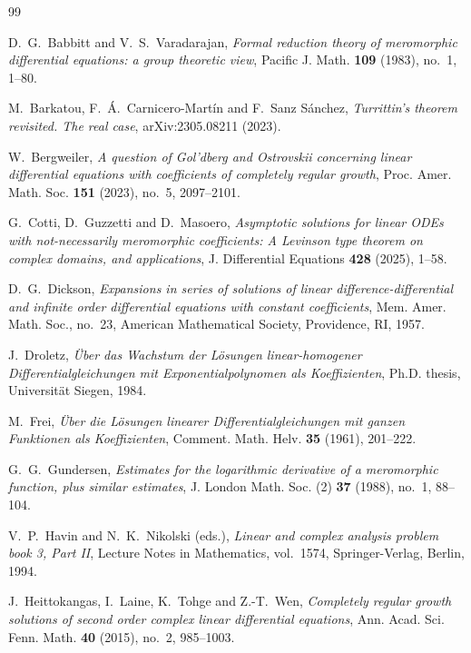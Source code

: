 \documentclass[a4paper,12pt]{article}
\numberwithin{equation}{section}
\begin{document}
\begin{thebibliography}{99}

D.~G.~Babbitt and V.~S.~Varadarajan,
\emph{Formal reduction theory of meromorphic differential equations:
a group theoretic view},
Pacific J. Math. \textbf{109} (1983), no.~1, 1--80.

M.~Barkatou, F.~\'A.~Carnicero-Mart\'in and F.~Sanz S\'anchez,
\emph{Turrittin's theorem revisited. The real case},
arXiv:2305.08211 (2023).

W.~Bergweiler,
\emph{A question of Gol'dberg and Ostrovskii concerning linear differential equations with coefficients of completely regular growth},
Proc. Amer. Math. Soc. \textbf{151} (2023), no.~5, 2097--2101.

G.~Cotti, D.~Guzzetti and D.~Masoero,
\emph{Asymptotic solutions for linear ODEs with not-necessarily
meromorphic coefficients: A Levinson type theorem on complex domains,
and applications},
J. Differential Equations \textbf{428} (2025), 1--58.

D.~G.~Dickson,
\emph{Expansions in series of solutions of linear difference-differential and infinite order differential equations with constant coefficients},
Mem. Amer. Math. Soc., no.~23,
American Mathematical Society, Providence, RI, 1957.

J.~Droletz,
\emph{\"Uber das Wachstum der L\"osungen linear-homogener Differentialgleichungen mit Exponentialpolynomen als Koeffizienten},
Ph.D. thesis, Universit\"at Siegen, 1984.

M.~Frei,
\emph{\"Uber die L\"osungen linearer Differentialgleichungen mit ganzen Funktionen als Koeffizienten},
Comment. Math. Helv. \textbf{35} (1961), 201--222.

G.~G.~Gundersen,
\emph{Estimates for the logarithmic derivative of a meromorphic function, plus similar estimates},
J. London Math. Soc. (2) \textbf{37} (1988), no.~1, 88--104.

V.~P.~Havin and N.~K.~Nikolski (eds.),
\emph{Linear and complex analysis problem book 3, Part II},
Lecture Notes in Mathematics, vol.~1574,
Springer-Verlag, Berlin, 1994.

J.~Heittokangas, I.~Laine, K.~Tohge and Z.-T.~Wen,
\emph{Completely regular growth solutions of second order complex linear differential equations},
Ann. Acad. Sci. Fenn. Math. \textbf{40} (2015), no.~2, 985--1003.


\end{thebibliography}
\end{document}

